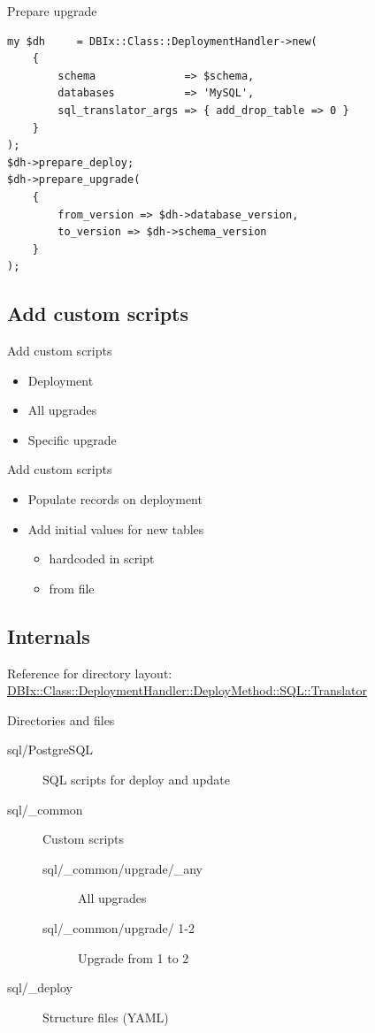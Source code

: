 \begin{frame}[fragile]{Prepare upgrade}
\begin{lstlisting}
my $dh     = DBIx::Class::DeploymentHandler->new(
    {
        schema              => $schema,
        databases           => 'MySQL',
        sql_translator_args => { add_drop_table => 0 }
    }
);
$dh->prepare_deploy;
$dh->prepare_upgrade(
    {
        from_version => $dh->database_version,
        to_version => $dh->schema_version
    }
);
\end{lstlisting}
\end{frame}

\subsection{Add custom scripts}

\begin{frame}{Add custom scripts}
\begin{itemize}
\item Deployment
\item All upgrades
\item Specific upgrade
\end{itemize}
\end{frame}

\begin{frame}{Add custom scripts}
\begin{itemize}
\item Populate records on deployment
\item Add initial values for new tables
\begin{itemize}
\item hardcoded in script
\item from file
\end{itemize}
\end{itemize}
\end{frame}

\subsection{Internals}

Reference for directory layout:
\href{https://metacpan.org/pod/DBIx::Class::DeploymentHandler::DeployMethod::SQL::Translator}{DBIx::Class::DeploymentHandler::DeployMethod::SQL::Translator}

\begin{frame}[fragile]{Directories and files}
\begin{description}
\item[sql/PostgreSQL] SQL scripts for deploy and update
\item[sql/\_common] Custom scripts
\begin{description}
\item[sql/\_common/upgrade/\_any] All upgrades
\item[sql/\_common/upgrade/ 1-2] Upgrade from 1 to 2
\end{description}
\item[sql/\_deploy] Structure files (YAML)
\end{description}
\end{frame}



